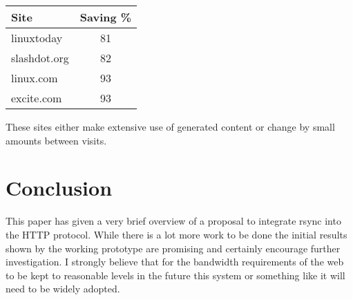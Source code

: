 \documentclass[a4paper]{article}
\begin{document}
\vspace*{5mm}
\begin{tabular}{|l|c|} \hline
{\bf Site } & { Saving \% } \\ \hline \hline
linuxtoday     &  81 \\ \hline
slashdot.org   &  82 \\ \hline
linux.com      &  93 \\ \hline
excite.com     &  93 \\ \hline
\end{tabular}
\vspace*{5mm}

These sites either make extensive use of generated content or change
by small amounts between visits.

\section*{Conclusion}

This paper has given a very brief overview of a proposal to integrate
rsync into the HTTP protocol. While there is a lot more work to be
done the initial results shown by the working prototype are promising
and certainly encourage further investigation. I strongly believe that
for the bandwidth requirements of the web to be kept to reasonable
levels in the future this system or something like it will need to be
widely adopted.
\end{document}
